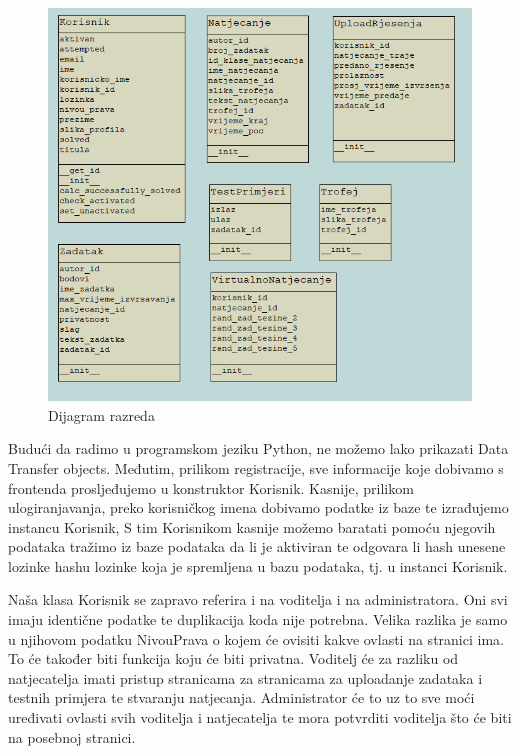 			\begin{figure}[H]
				\includegraphics[width=\textwidth]{slike/DijagramRazreda.png} %
				\caption{Dijagram razreda}
				\label{fig:DijagramRazreda} %
			\end{figure}	
			

			Budući da radimo u programskom jeziku Python, ne možemo lako prikazati Data Transfer objects.
			Međutim, prilikom registracije, sve informacije koje dobivamo s frontenda prosljeđujemo u konstruktor
			Korisnik. Kasnije, prilikom ulogiranjavanja, preko korisničkog imena dobivamo podatke iz baze te izrađujemo instancu Korisnik,
			S tim Korisnikom kasnije možemo baratati pomoću njegovih podataka tražimo iz baze podataka da li je aktiviran te odgovara li
			hash unesene lozinke hashu lozinke koja je spremljena u bazu podataka, tj. u instanci Korisnik.

			Naša klasa Korisnik se zapravo referira i na voditelja i na administratora. Oni svi imaju identične podatke te duplikacija koda
			nije potrebna. Velika razlika je samo u njihovom podatku NivouPrava o kojem će ovisiti kakve ovlasti na stranici ima.
			To će također biti funkcija koju će biti privatna. Voditelj će za razliku od natjecatelja imati pristup stranicama
			za stranicama za uploadanje zadataka i testnih primjera te stvaranju natjecanja. Administrator će to uz to sve moći 
			uređivati ovlasti svih voditelja i natjecatelja te mora potvrditi voditelja što će biti na posebnoj stranici.



